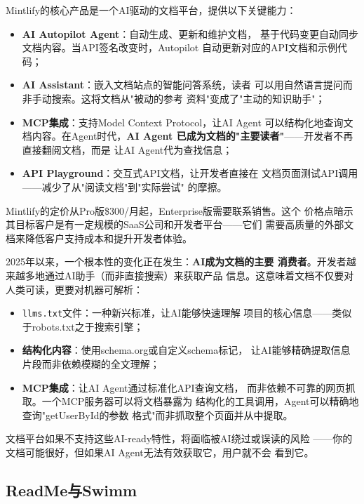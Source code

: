 Mintlify的核心产品是一个AI驱动的文档平台，提供以下关键能力：

\begin{itemize}
  \item \textbf{AI Autopilot Agent}：自动生成、更新和维护文档，
    基于代码变更自动同步文档内容。当API签名改变时，Autopilot
    自动更新对应的API文档和示例代码；
  \item \textbf{AI Assistant}：嵌入文档站点的智能问答系统，读者
    可以用自然语言提问而非手动搜索。这将文档从"被动的参考
    资料"变成了"主动的知识助手"；
  \item \textbf{MCP集成}：支持Model Context Protocol，让AI Agent
    可以结构化地查询文档内容。在Agent时代，\textbf{AI Agent
    已成为文档的"主要读者"}——开发者不再直接翻阅文档，而是
    让AI Agent代为查找信息；
  \item \textbf{API Playground}：交互式API文档，让开发者直接在
    文档页面测试API调用——减少了从"阅读文档"到"实际尝试"
    的摩擦。
\end{itemize}

Mintlify的定价从Pro版\$300/月起，Enterprise版需要联系销售。这个
价格点暗示其目标客户是有一定规模的SaaS公司和开发者平台——它们
需要高质量的外部文档来降低客户支持成本和提升开发者体验。

\begin{whybox}
2025年以来，一个根本性的变化正在发生：\textbf{AI成为文档的主要
消费者}。开发者越来越多地通过AI助手（而非直接搜索）来获取产品
信息。这意味着文档不仅要对人类可读，更要对机器可解析：
\begin{itemize}
  \item \texttt{llms.txt}文件：一种新兴标准，让AI能够快速理解
    项目的核心信息——类似于robots.txt之于搜索引擎；
  \item \textbf{结构化内容}：使用schema.org或自定义schema标记，
    让AI能够精确提取信息片段而非依赖模糊的全文理解；
  \item \textbf{MCP集成}：让AI Agent通过标准化API查询文档，
    而非依赖不可靠的网页抓取。一个MCP服务器可以将文档暴露为
    结构化的工具调用，Agent可以精确地查询"getUserById的参数
    格式"而非抓取整个页面并从中提取。
\end{itemize}
文档平台如果不支持这些AI-ready特性，将面临被AI绕过或误读的风险
——你的文档可能很好，但如果AI Agent无法有效获取它，用户就不会
看到它。
\end{whybox}

\subsection{ReadMe与Swimm}
\label{subsec:readme-swimm}

